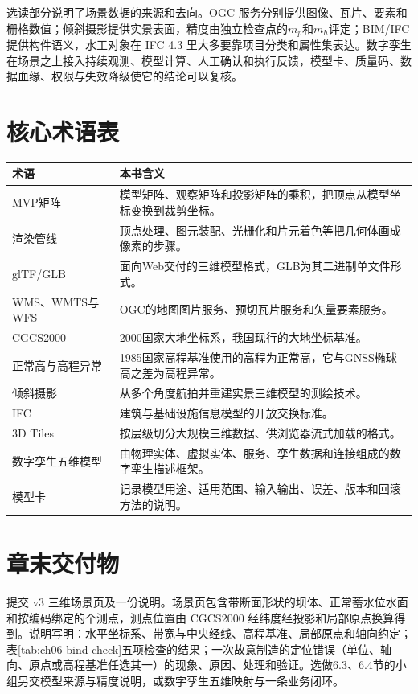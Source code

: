 选读部分说明了场景数据的来源和去向。OGC 服务分别提供图像、瓦片、要素和栅格数值；倾斜摄影提供实景表面，精度由独立检查点的$m_p$和$m_h$评定；BIM/IFC 提供构件语义，水工对象在 IFC 4.3 里大多要靠项目分类和属性集表达。数字孪生在场景之上接入持续观测、模型计算、人工确认和执行反馈，模型卡、质量码、数据血缘、权限与失效降级使它的结论可以复核。

\section*{核心术语表}

\begin{longtable}{p{2.6cm}p{10.0cm}}
\toprule
术语 & 本书含义 \\
\midrule
MVP矩阵 & 模型矩阵、观察矩阵和投影矩阵的乘积，把顶点从模型坐标变换到裁剪坐标。 \\
渲染管线 & 顶点处理、图元装配、光栅化和片元着色等把几何体画成像素的步骤。 \\
glTF/GLB & 面向Web交付的三维模型格式，GLB为其二进制单文件形式。 \\
WMS、WMTS与WFS & OGC的地图图片服务、预切瓦片服务和矢量要素服务。 \\
CGCS2000 & 2000国家大地坐标系，我国现行的大地坐标基准。 \\
正常高与高程异常 & 1985国家高程基准使用的高程为正常高，它与GNSS椭球高之差为高程异常。 \\
倾斜摄影 & 从多个角度航拍并重建实景三维模型的测绘技术。 \\
IFC & 建筑与基础设施信息模型的开放交换标准。 \\
3D Tiles & 按层级切分大规模三维数据、供浏览器流式加载的格式。 \\
数字孪生五维模型 & 由物理实体、虚拟实体、服务、孪生数据和连接组成的数字孪生描述框架。 \\
模型卡 & 记录模型用途、适用范围、输入输出、误差、版本和回滚方法的说明。 \\
\bottomrule
\end{longtable}

\section*{章末交付物}

提交 v3 三维场景页及一份说明。场景页包含带断面形状的坝体、正常蓄水位水面和按编码绑定的\cpStationCount 个测点，测点位置由 CGCS2000 经纬度经投影和局部原点换算得到。说明写明：水平坐标系、带宽与中央经线、高程基准、局部原点和轴向约定；表\ref{tab:ch06-bind-check}五项检查的结果；一次故意制造的定位错误（单位、轴向、原点或高程基准任选其一）的现象、原因、处理和验证。选做6.3、6.4节的小组另交模型来源与精度说明，或数字孪生五维映射与一条业务闭环。

